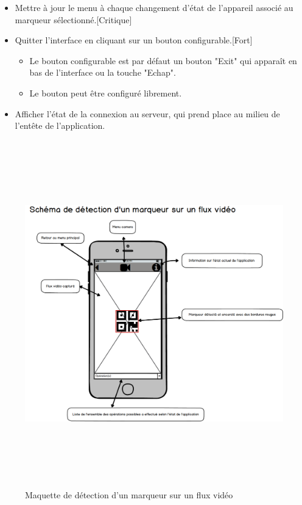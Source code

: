 \documentclass[12pt,a4paper]{article}
\begin{document}
\begin{itemize}
\begin{itemize}
  \end{itemize}
\item Mettre à jour le menu à chaque changement d'état de l'appareil associé au marqueur sélectionné.[Critique]
\item Quitter l'interface en cliquant sur un bouton configurable.[Fort]
  \begin{itemize}
  \item Le bouton configurable est par défaut un bouton "Exit" qui apparaît en bas de l'interface ou la touche "Echap".
  \item Le bouton peut être configuré librement.
  \end{itemize}
\item Afficher l'état de la connexion au serveur, qui prend place au milieu de l'entête de l'application.
\end{itemize}

\begin{figure}[H]
  \centering
  \includegraphics[width = 15cm,height=15cm]{prototype_app.png}
  \caption{Maquette de détection d'un marqueur sur un flux vidéo}
\end{figure}

\end{document}
